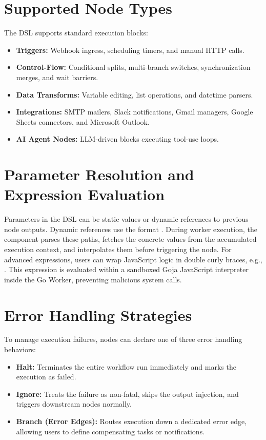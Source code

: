 \documentclass[12pt]{report}
\begin{document}
\section{Supported Node Types}
The DSL supports standard execution blocks:
\begin{itemize}
    \item \textbf{Triggers:} Webhook ingress, scheduling timers, and manual HTTP calls.
    \item \textbf{Control-Flow:} Conditional splits, multi-branch switches, synchronization merges, and wait barriers.
    \item \textbf{Data Transforms:} Variable editing, list operations, and datetime parsers.
    \item \textbf{Integrations:} SMTP mailers, Slack notifications, Gmail managers, Google Sheets connectors, and Microsoft Outlook.
    \item \textbf{AI Agent Nodes:} LLM-driven blocks executing tool-use loops.
\end{itemize}

\section{Parameter Resolution and Expression Evaluation}
Parameters in the DSL can be static values or dynamic references to previous node outputs. Dynamic references use the format . During worker execution, the  component parses these paths, fetches the concrete values from the accumulated execution context, and interpolates them before triggering the node.
For advanced expressions, users can wrap JavaScript logic in double curly braces, e.g., . This expression is evaluated within a sandboxed Goja JavaScript interpreter inside the Go Worker, preventing malicious system calls.

\section{Error Handling Strategies}
To manage execution failures, nodes can declare one of three error handling behaviors:
\begin{itemize}
    \item \textbf{Halt:} Terminates the entire workflow run immediately and marks the execution as failed.
    \item \textbf{Ignore:} Treats the failure as non-fatal, skips the output injection, and triggers downstream nodes normally.
    \item \textbf{Branch (Error Edges):} Routes execution down a dedicated error edge, allowing users to define compensating tasks or notifications.
\end{itemize}
\end{document}
